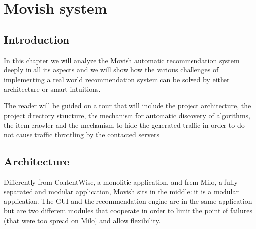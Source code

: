 \chapter{Movish system}
\label{chapter:movish_system}

\section{Introduction}
\label{sec:movish_system_introduction}

In this chapter we will analyze the Movish automatic recommendation system deeply in all its aspects and we will show how the various challenges of implementing a real world recommendation system can be solved by either architecture or smart intuitions.

The reader will be guided on a tour that will include the project architecture, the project directory structure, the mechanism for automatic discovery of algorithms, the item crawler and the mechanism to hide the generated traffic in order to do not cause traffic throttling by the contacted servers.

\section{Architecture}
\label{sec:architecture}

Differently from ContentWise, a monolitic application, and from Milo, a fully separated and modular application, Movish sits in the middle: it is a modular application. The \ac{GUI} and the recommendation engine are in the same application but are two different modules that cooperate in order to limit the point of failures (that were too spread on Milo) and allow flexibility.

